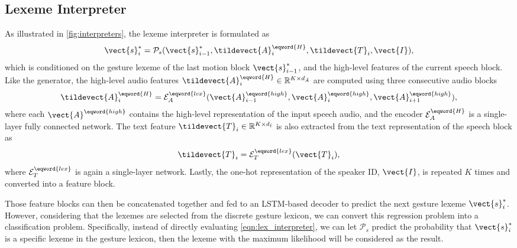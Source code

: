 \subsection{Lexeme Interpreter}
\label{subsec:lexeme_interpreter}
As illustrated in \fig\ref{fig:interpreters}, the lexeme interpreter is formulated as
\begin{equation}
    \vect{s}_i^*=\mathcal{P}_s(\vect{s}_{i-1}^*, \tildevect{A}_i^{\eqword{H}}, \tildevect{T}_i, \vect{I}), 
    \label{eqn:lex_interpreter}
\end{equation}
which is conditioned on the gesture lexeme of the last motion block $\vect{s}_{i-1}^*$, and the high-level features of the current speech block. Like the generator, the high-level audio features $\tildevect{A}_i^{\eqword{H}}\in\mathbb{R}^{K\times{}d_{\tilde{A}}}$ are computed using three consecutive audio blocks
\begin{equation}
    \tildevect{A}_i^{\eqword{H}}=\mathcal{E}_A^{\eqword{lex}}(\vect{A}^{\eqword{high}}_{i-1},\vect{A}^{\eqword{high}}_{i},\vect{A}^{\eqword{high}}_{i+1}),
\end{equation}
where each $\vect{A}^{\eqword{high}}$ contains the high-level representation of the input speech audio, and the encoder $\mathcal{E}_A^{\eqword{H}}$ is a single-layer fully connected network. 
%
The text feature $\tildevect{T}_i\in\mathbb{R}^{K\times{}d_{\tilde{t}}}$ is also extracted from the text representation of the speech block as 
\begin{equation}
    \tildevect{T}_i=\mathcal{E}_T^{\eqword{lex}}(\vect{T}_i),
\end{equation}
where $\mathcal{E}_T^{\eqword{lex}}$ is again a single-layer network. %
%
Lastly, the one-hot representation of the speaker ID, $\vect{I}$, is repeated $K$ times and converted into a feature block.

Those feature blocks can then be concatenated together and fed to an LSTM-based decoder to predict the next gesture lexeme $\vect{s}_i^*$. However, considering that the lexemes are selected from the discrete gesture lexicon, we can convert this regression problem into a classification problem. Specifically, instead of directly evaluating \eqn\eqref{eqn:lex_interpreter}, we can let $\mathcal{P}_s$ predict the probability that $\vect{s}_i^*$ is a specific lexeme in the gesture lexicon, then the lexeme with the maximum likelihood will be considered as the result.

